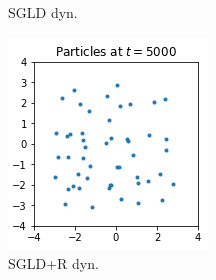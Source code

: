 \begin{figure}[!htb]
\begin{subfigure}[b]{0.2\textwidth}
        \caption{SGLD dyn.}
        \label{fig:tiger}
    \end{subfigure}
    \begin{subfigure}[b]{0.2\textwidth}
        \includegraphics[width=\textwidth]{img/psvgd.png}
        \caption{SGLD+R dyn.}
        \label{fig:mouse}
    \end{subfigure}
    \begin{subfigure}[b]{0.2\textwidth}

\end{subfigure}
\end{figure}
